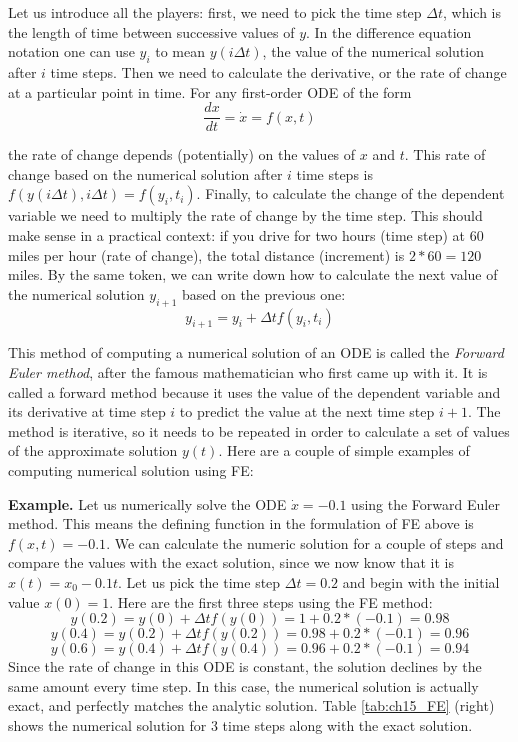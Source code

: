 \documentclass[
]{book}
\theoremstyle{definition}
\theoremstyle{definition}
\theoremstyle{definition}
\theoremstyle{remark}
\begin{document}
Let us introduce all the players: first, we need to pick the time step \(\Delta t\), which is the length of time between successive values of \(y\). In the difference equation notation one can use \(y_i\) to mean \(y(i\Delta t)\), the value of the numerical solution after \(i\) time steps. Then we need to calculate the derivative, or the rate of change at a particular point in time. For any first-order ODE of the form
\[ \frac{d x} {dt} = \dot x = f(x,t)\]

the rate of change depends (potentially) on the values of \(x\) and \(t\). This rate of change based on the numerical solution after \(i\) time steps is \(f(y(i\Delta t), i\Delta t) = f(y_i, t_i)\). Finally, to calculate the change of the dependent variable we need to multiply the rate of change by the time step. This should make sense in a practical context: if you drive for two hours (time step) at 60 miles per hour (rate of change), the total distance (increment) is \(2*60=120\) miles. By the same token, we can write down how to calculate the next value of the numerical solution \(y_{i+1}\) based on the previous one:
\begin{equation}
 y_{i+1} = y_i + \Delta t f(y_i, t_i) 
 \label{eq:ch15_FE}
\end{equation}

This method of computing a numerical solution of an ODE is called the  \emph{Forward Euler method}, after the famous mathematician who first came up with it. It is called a forward method because it uses the value of the dependent variable and its derivative at time step \(i\) to predict the value at the next time step \(i+1\). The method is iterative, so it needs to be repeated in order to calculate a set of values of the approximate solution \(y(t)\). Here are a couple of simple examples of computing numerical solution using FE:

\textbf{Example.} Let us numerically solve the ODE \(\dot x = -0.1\) using the Forward Euler method. This means the defining function in the formulation of FE above is \(f(x,t)=-0.1\). We can calculate the numeric solution for a couple of steps and compare the values with the exact solution, since we now know that it is \(x(t) = x_0 -0.1t\). Let us pick the time step \(\Delta t = 0.2\) and begin with the initial value \(x(0)=1\). Here are the first three steps using the FE method:
\[ y(0.2) = y(0) + \Delta t f(y(0)) = 1 + 0.2*(-0.1) = 0.98\]
\[ y(0.4) = y(0.2) + \Delta t f(y(0.2)) = 0.98+ 0.2*(-0.1) = 0.96\]
\[ y(0.6) = y(0.4) + \Delta t f(y(0.4)) = 0.96+ 0.2*(-0.1) = 0.94\]
Since the rate of change in this ODE is constant, the solution declines by the same amount every time step. In this case, the numerical solution is actually exact, and perfectly matches the analytic solution. Table \ref{tab:ch15_FE} (right) shows the numerical solution for 3 time steps along with the exact solution.
\end{document}
